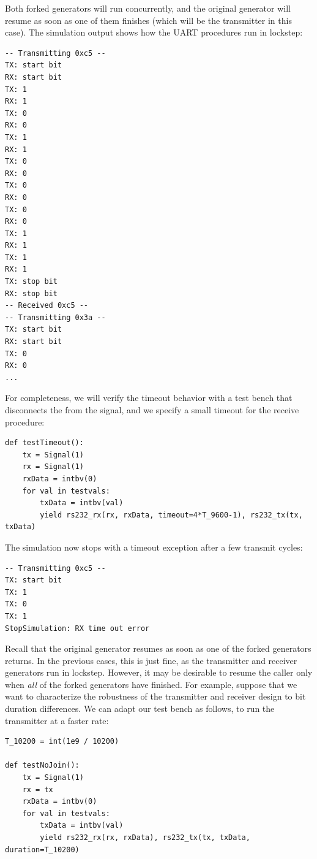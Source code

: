 Both forked generators will run concurrently, and the original
generator will resume as soon as one of them finishes (which will be
the transmitter in this case).  The simulation output shows how
the UART procedures run in lockstep:

\begin{verbatim}
-- Transmitting 0xc5 --
TX: start bit
RX: start bit
TX: 1
RX: 1
TX: 0
RX: 0
TX: 1
RX: 1
TX: 0
RX: 0
TX: 0
RX: 0
TX: 0
RX: 0
TX: 1
RX: 1
TX: 1
RX: 1
TX: stop bit
RX: stop bit
-- Received 0xc5 --
-- Transmitting 0x3a --
TX: start bit
RX: start bit
TX: 0
RX: 0
...
\end{verbatim}

For completeness, we will verify the timeout behavior with a test
bench that disconnects the  from the  signal, and we
specify a small timeout for the receive procedure:

\begin{verbatim}
def testTimeout():
    tx = Signal(1)
    rx = Signal(1)
    rxData = intbv(0)
    for val in testvals:
        txData = intbv(val)
        yield rs232_rx(rx, rxData, timeout=4*T_9600-1), rs232_tx(tx, txData)
\end{verbatim}
 
The simulation now stops with a timeout exception after a few
transmit cycles:

\begin{verbatim}
-- Transmitting 0xc5 --
TX: start bit
TX: 1
TX: 0
TX: 1
StopSimulation: RX time out error
\end{verbatim}

Recall that the original generator resumes as soon as one of the
forked generators returns. In the previous cases, this is just fine,
as the transmitter and receiver generators run in lockstep. However,
it may be desirable to resume the caller only when \emph{all} of the
forked generators have finished. For example, suppose that we want to
characterize the robustness of the transmitter and receiver design to
bit duration differences. We can adapt our test bench as follows, to
run the transmitter at a faster rate:

\begin{verbatim}
T_10200 = int(1e9 / 10200)

def testNoJoin():
    tx = Signal(1)
    rx = tx
    rxData = intbv(0)
    for val in testvals:
        txData = intbv(val)
        yield rs232_rx(rx, rxData), rs232_tx(tx, txData, duration=T_10200)
\end{verbatim}

